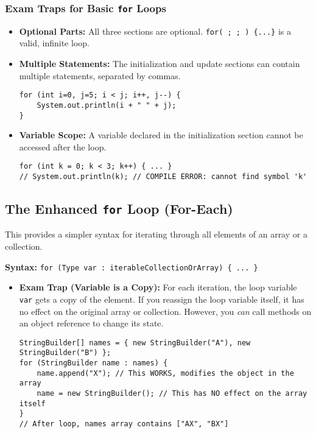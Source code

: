 \documentclass[12pt]{article}
\begin{document}
\begin{enumerate}[label=(\arabic*)]
\subsubsection*{Exam Traps for Basic \texttt{for} Loops}
\begin{itemize}
    \item \textbf{Optional Parts:} All three sections are optional. \texttt{for( ; ; ) \{...\}} is a valid, infinite loop.
    \item \textbf{Multiple Statements:} The initialization and update sections can contain multiple statements, separated by commas.
    \begin{verbatim}
for (int i=0, j=5; i < j; i++, j--) {
    System.out.println(i + " " + j);
}
    \end{verbatim}
    \item \textbf{Variable Scope:} A variable declared in the initialization section cannot be accessed after the loop.
    \begin{verbatim}
for (int k = 0; k < 3; k++) { ... } 
// System.out.println(k); // COMPILE ERROR: cannot find symbol 'k'
    \end{verbatim}
\end{itemize}

\subsection*{The Enhanced \texttt{for} Loop (For-Each)}
This provides a simpler syntax for iterating through all elements of an array or a collection.

\textbf{Syntax:} \texttt{for (Type var : iterableCollectionOrArray) \{ ... \}}
\begin{itemize}
    \item \textbf{Exam Trap (Variable is a Copy):} For each iteration, the loop variable \texttt{var} gets a copy of the element. If you reassign the loop variable itself, it has no effect on the original array or collection. However, you \textit{can} call methods on an object reference to change its state.
    \begin{verbatim}
StringBuilder[] names = { new StringBuilder("A"), new StringBuilder("B") };
for (StringBuilder name : names) {
    name.append("X"); // This WORKS, modifies the object in the array
    name = new StringBuilder(); // This has NO effect on the array itself
}
// After loop, names array contains ["AX", "BX"]
    \end{verbatim}
\end{itemize}
\end{enumerate}
\end{document}
